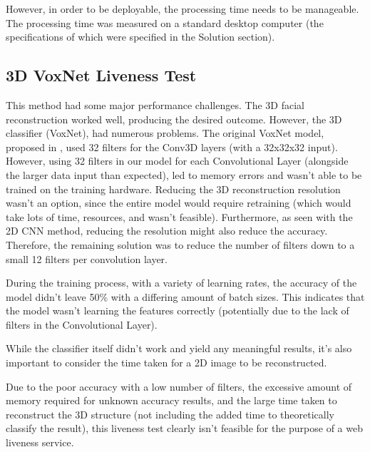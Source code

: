 \documentclass[11pt,a4paper]{article}
\begin{document}
        However, in order to be deployable, the processing time needs to be manageable. The processing time was measured on a standard desktop computer (the specifications of which were specified in the Solution section).

    
    \subsection{3D VoxNet Liveness Test}
        This method had some major performance challenges. The 3D facial reconstruction worked well, producing the desired outcome. However, the 3D classifier (VoxNet), had numerous problems.
        The original VoxNet model, proposed in \cite{VoxNetModel}, used 32 filters for the Conv3D layers (with a 32x32x32 input). However, using 32 filters in our model for each Convolutional Layer (alongside the larger data input than expected),
        led to memory errors and wasn't able to be trained on the training hardware.  Reducing the 3D reconstruction resolution wasn't an option, since the entire model would require retraining (which would take lots of time, resources, and wasn't feasible).
        Furthermore, as seen with the 2D CNN method, reducing the resolution might also reduce the accuracy. Therefore, the remaining solution was to reduce the number of filters down to a small 12 filters per convolution layer.

        During the training process, with a variety of learning rates, the accuracy of the model didn't leave 50\% with a differing amount of batch sizes. This indicates that the model wasn't learning the features correctly (potentially due to the lack of filters in the Convolutional Layer).
        
        While the classifier itself didn't work and yield any meaningful results, it's also important to consider the time taken for a 2D image to be reconstructed. 

        Due to the poor accuracy with a low number of filters, the excessive amount of memory required for unknown accuracy results, and the large time taken to reconstruct the 3D structure (not including the added time to theoretically classify the result),
        this liveness test clearly isn't feasible for the purpose of a web liveness service.
\end{document}
